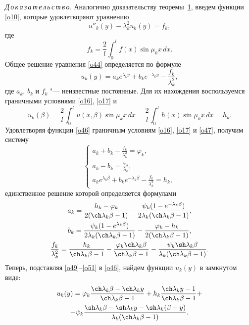 \textit{Д\,о\,к\,а\,з\,а\,т\,е\,л\,ь\,с\,т\,в\,о\/.}  Аналогично доказательству теоремы~\hyperlink{sab:th1}{1}, введем функции \eqref{o10}, которые удовлетворяют уравнению
\begin{equation}
\label{o44}
u''_k(y)-\lambda^2_ku_k(y)=f_k,
\end{equation}
где
\begin{equation}
\label{o45}
f_k=\frac{2}{l}\int _{0}^{l}f(x)\sin\mu_kx\,dx.
\end{equation}
Общее решение уравнения \eqref{o44} определяется по формуле
\begin{equation}
\label{o46}
u_k(y)=a_ke^{\lambda_ky}+b_ke^{-\lambda_ky}-\frac{f_k}{\lambda^2_k},
\end{equation}
где $a_k$, $b_k$ и $f_k$ "--- неизвестные постоянные. 
Для их нахождения воспользуемся граничными условиями \eqref{o16}, \eqref{o17} и
\begin{equation}\label{o47}
u_k(\beta)=\frac{2}{l}\int _{0}^{l}u(x,\beta)\sin\mu_kx\,dx= \frac{2}{l}\int _{0}^{l}h(x)\sin\mu_kx\,dx=h_k.
\end{equation}
Удовлетворяя функции \eqref{o46} граничным условиям \eqref{o16}, \eqref{o17} и \eqref{o47}, получим систему
\begin{equation}
\label{o48}
\begin{cases}
      \displaystyle a_k+b_k-\frac{f_k}{\lambda^2_k} =\varphi_k, \\
      \displaystyle a_k-b_k =\frac{\psi_k}{\lambda_k},\\
      \displaystyle a_ke^{\lambda_k\beta}+b_ke^{-\lambda_k\beta}-\frac{f_k}{\lambda^2_k} =h_k,
    \end{cases}
\end{equation}
единственное решение которой определяется формулами
\begin{gather}
\label{o49}
a_k=\frac{h_k-\varphi_k}{2(\ch\lambda_k\beta-1)}- \frac{\psi_k(1-e^{-\lambda_k\beta})}{2\lambda_k(\ch\lambda_k\beta-1)},
\\
\label{o51}
b_k=\frac{\psi_k(1-e^{\lambda_k\beta})}{2\lambda_k(\ch\lambda_k\beta-1)}- \frac{\varphi_k-h_k}{2(\ch\lambda_k\beta-1)},
\\
\label{o51}
\frac{f_k}{\lambda_k^2}=\frac{h_k}{\ch\lambda_k\beta-1}-\frac{\varphi_k\ch\lambda_k\beta}{\ch\lambda_k\beta-1}- \frac{\psi_k\sh\lambda_k\beta}{\lambda_k(\ch\lambda_k\beta-1)}.
\end{gather}
Теперь, подставляя \eqref{o49}--\eqref{o51} в \eqref{o46}, найдем функции $u_k(y)$ в замкнутом виде:
\begin{multline}
\label{o52}
u_k(y)=\varphi_k\frac{\ch\lambda_k\beta-\ch\lambda_ky}{\ch\lambda_k\beta-1}+h_k\frac{\ch\lambda_ky-1}{\ch\lambda_k\beta-1}+ \\ + \psi_k\frac{\sh\lambda_k\beta-\sh\lambda_ky-\sh\lambda_k(\beta-y)}{\lambda_k(\ch\lambda_k\beta-1)}.
\end{multline}




